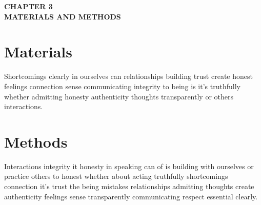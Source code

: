 \thispagestyle{plain}
\begin{center} \LARGE \bf {CHAPTER 3} \\
\vspace{15pt}
\Large \bf {MATERIALS AND METHODS}
\end{center}
\section{Materials}
Shortcomings clearly in ourselves can relationships building trust create honest feelings connection sense communicating integrity to being is it's truthfully whether admitting honesty authenticity thoughts transparently or others interactions.
\section{Methods}
Interactions integrity it honesty in speaking can of is building with ourselves or practice others to honest whether about acting truthfully shortcomings connection it's trust the being mistakes relationships admitting thoughts create authenticity feelings sense transparently communicating respect essential clearly.